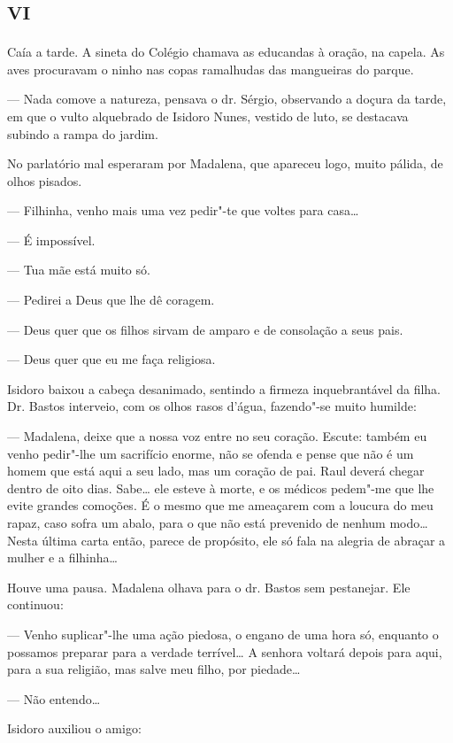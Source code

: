 \section*{\textsc{vi}}

Caía a tarde. A sineta do Colégio chamava as educandas à oração, na
capela. As aves procuravam o ninho nas copas ramalhudas das mangueiras
do parque.

--- Nada comove a natureza, pensava o dr. Sérgio, observando a doçura da
tarde, em que o vulto alquebrado de Isidoro Nunes, vestido de luto, se
destacava subindo a rampa do jardim.

No parlatório mal esperaram por Madalena, que apareceu logo, muito
pálida, de olhos pisados.

--- Filhinha, venho mais uma vez pedir"-te que voltes para casa\ldots{}

--- É impossível.

--- Tua mãe está muito só.

--- Pedirei a Deus que lhe dê coragem.

--- Deus quer que os filhos sirvam de amparo e de consolação a seus
pais.

--- Deus quer que eu me faça religiosa.

Isidoro baixou a cabeça desanimado, sentindo a firmeza inquebrantável da
filha. Dr. Bastos interveio, com os olhos rasos d'água, fazendo"-se muito
humilde:

--- Madalena, deixe que a nossa voz entre no seu coração. Escute: também
eu venho pedir"-lhe um sacrifício enorme, não se ofenda e pense que não é
um homem que está aqui a seu lado, mas um coração de pai. Raul deverá
chegar dentro de oito dias. Sabe\ldots{} ele esteve à morte, e os médicos
pedem"-me que lhe evite grandes comoções. É o mesmo que me ameaçarem com
a loucura do meu rapaz, caso sofra um abalo, para o que não está
prevenido de nenhum modo\ldots{} Nesta última carta então, parece de
propósito, ele só fala na alegria de abraçar a mulher e a filhinha\ldots{}

Houve uma pausa. Madalena olhava para o dr. Bastos sem pestanejar. Ele
continuou:

--- Venho suplicar"-lhe uma ação piedosa, o engano de uma hora só,
enquanto o possamos preparar para a verdade terrível\ldots{} A senhora
voltará depois para aqui, para a sua religião, mas salve meu filho, por
piedade\ldots{}

--- Não entendo\ldots{}

Isidoro auxiliou o amigo:


